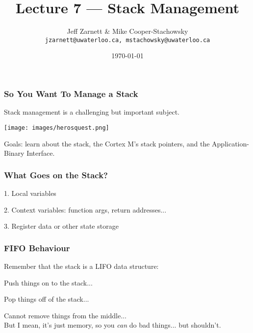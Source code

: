 

\title{Lecture 7 --- Stack Management }

\author{Jeff Zarnett \& Mike Cooper-Stachowsky \\ \small \texttt{jzarnett@uwaterloo.ca, mstachowsky@uwaterloo.ca}}
\date{\today}




\begin{frame}
	\titlepage

\end{frame}


\begin{frame}
\frametitle{So You Want To Manage a Stack}

Stack management is a challenging but important subject.

\begin{center}
	\texttt{[image: images/herosquest.png]}
\end{center}

Goals: learn about the stack, the Cortex M's stack pointers, and the Application-Binary Interface.


\end{frame}


\begin{frame}
\frametitle{What Goes on the Stack?}

1. Local variables

2. Context variables: function args, return addresses...

3. Register data or other state storage

\end{frame}


\begin{frame}
\frametitle{FIFO Behaviour}

Remember that the stack is a LIFO data structure:

\alert{Push} things on to the stack...

\alert{Pop} things off of the stack...

Cannot remove things from the middle...\\
\quad But I mean, it's just memory, so you \textit{can} do bad things... but shouldn't.


\end{frame}



